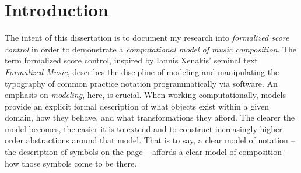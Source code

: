 \chapter{Introduction}
\label{chap:introduction}

The intent of this dissertation is to document my research into
\emph{formalized score control}\cite{ baca2011xi, baca2015tenor,
trevino2013compositional} in order to demonstrate a \emph{computational model
of music composition}. The term formalized score control, inspired by Iannis
Xenakis' seminal text \emph{Formalized Music}\cite{xenakis1992formalized,
baca2012}, describes the discipline of modeling and manipulating the typography
of common practice notation programmatically via software. An emphasis on
\emph{modeling}, here, is crucial. When working computationally, models provide
an explicit formal description of what objects exist within a given domain, how
they behave, and what transformations they afford. The clearer the model
becomes, the easier it is to extend and to construct increasingly higher-order
abstractions around that model. That is to say, a clear model of notation --
the description of symbols on the page -- affords a clear model of composition
-- how those symbols come to be there.

